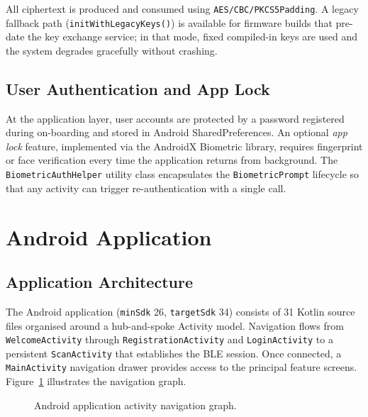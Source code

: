 \noindent All ciphertext is produced and consumed using \texttt{AES/CBC/PKCS5Padding}.  A legacy fallback
path (\texttt{initWithLegacyKeys()}) is available for firmware builds that pre-date the key
exchange service; in that mode, fixed compiled-in keys are used and the system degrades gracefully
without crashing. \\


\subsection{User Authentication and App Lock}
\label{subsec:sec_auth}

\noindent At the application layer, user accounts are protected by a password registered during
on-boarding and stored in Android SharedPreferences. An optional \textit{app lock} feature,
implemented via the AndroidX Biometric library, requires fingerprint or face verification every
time the application returns from background.  The \texttt{BiometricAuthHelper} utility class
encapsulates the \texttt{BiometricPrompt} lifecycle so that any activity can trigger
re-authentication with a single call. \\

\section{Android Application}
\label{sec:android}


\subsection{Application Architecture}
\label{subsec:android_arch}

The Android application (\texttt{minSdk} 26, \texttt{targetSdk} 34) consists of 31 Kotlin source
files organised around a hub-and-spoke Activity model.  Navigation flows from
\texttt{WelcomeActivity} through \texttt{RegistrationActivity} and \texttt{LoginActivity} to a
persistent \texttt{ScanActivity} that establishes the BLE session.  Once connected, a
\texttt{MainActivity} navigation drawer provides access to the principal feature screens.
Figure~\ref{fig:activity_nav} illustrates the navigation graph.

\begin{figure}[htbp]
  \centering
  \caption{Android application activity navigation graph.}
  \label{fig:activity_nav}
\end{figure}

